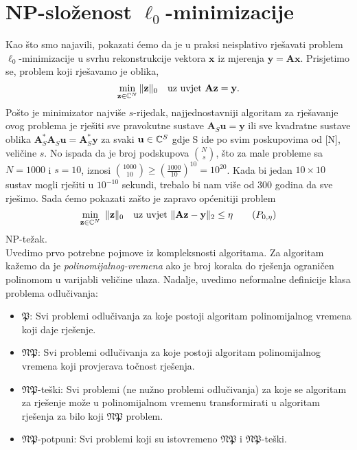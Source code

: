 \documentclass[a4paper,twoside,12pt]{memoir} %
\newcommand{\vect}[1]{\mathbf{#1}}
\renewcommand{\vec}{\vect}
\newcommand{\norm}[1]{\|{#1}\|}
\begin{document}
\section[NP-slo\v{z}enost $\mathbf{\ell_0}$-minimizacije][NP-slo\v{z}enost $\ell_0$-minimizacije]{NP-slo\v{z}enost $\ell_0$-minimizacije}
Kao \v{s}to smo najavili, pokazati \'cemo da je u praksi neisplativo rje\v{s}avati problem $\ell_0$-minimizacije u svrhu rekonstrukcije vektora $\vec x$ iz mjerenja $\vec y = \vec{Ax}$. Prisjetimo se, problem koji rje\v{s}avamo je oblika, 
\begin{equation*}
    \min_{\vec z \in \C^N} \norm{\vec z}_0 \quad \text{uz uvjet } \vec{Az}=\vec y. 
\end{equation*}
Po\v{s}to je minimizator najvi\v{s}e $s$-rijedak, najjednostavniji algoritam za rje\v{s}avanje ovog problema je rje\v{s}iti sve pravokutne sustave $\vec A_S \vec u = \vec y$ ili sve kvadratne sustave oblika $\vec A_S^* \vec A_S \vec u = \vec A_S^* \vec y$ za svaki $\vec u \in \C^S$ gdje S ide po svim poskupovima od [N], veli\v{c}ine $s$. No ispada da je broj podskupova $N \choose s$, \v{s}to za male probleme sa $N = 1000$ i $s=10$, iznosi ${1000 \choose 10} \geq (\frac{1000}{10})^{10}=10^{20}$. Kada bi jedan $10 \times 10$ sustav mogli rje\v{s}iti u $10^{-10}$ sekundi, trebalo bi nam vi\v{s}e od 300 godina da sve rje\v{s}imo. Sada \'cemo pokazati za\v{s}to je zapravo op\'cenitiji problem
\begin{equation}
\min_{\vec z \in \C^N}\ \norm{\vec z}_0 \quad \text{uz uvjet }\norm{\vec{Az}- \vec{y}}_2 \leq \eta \tag{$P_{0, \eta}$}\label{problem_minimizacije_generalni}
\end{equation}
NP-te\v{z}ak.\\
\indent Uvedimo prvo potrebne pojmove iz kompleksnosti algoritama. Za algoritam ka\v{z}emo da je \textit{polinomijalnog-vremena} ako je broj koraka do rje\v{s}enja ograni\v{c}en polinomom u varijabli veli\v{c}ine ulaza. Nadalje, uvedimo neformalne definicije klasa problema odlu\v{c}ivanja:
\begin{itemize}
    \item $\mathfrak{P}$: Svi problemi odlu\v{c}ivanja za koje postoji algoritam polinomijalnog vremena koji daje rje\v{s}enje.
    \item $\mathfrak{NP}$: Svi problemi odlu\v{c}ivanja za koje postoji algoritam polinomijalnog vremena koji provjerava to\v{c}nost rje\v{s}enja.
    \item $\mathfrak{NP}$-te\v{s}ki: Svi problemi (ne nu\v{z}no problemi odlu\v{c}ivanja) za koje se algoritam za rje\v{s}enje mo\v{z}e u polinomijalnom vremenu transformirati u algoritam rje\v{s}enja za bilo koji $\mathfrak{NP}$ problem.
    \item $\mathfrak{NP}$-potpuni: Svi problemi koji su istovremeno $\mathfrak{NP}$ i $\mathfrak{NP}$-te\v{s}ki.
\end{itemize}
\end{document}
